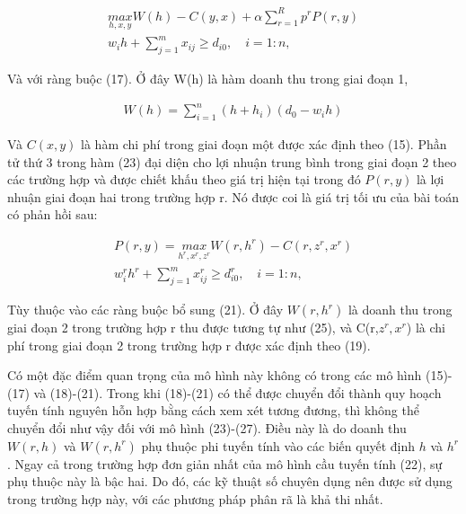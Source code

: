\documentclass[a4paper]{article}
\begin{document}
\begin{itemize}
        \begin{gather}
            \underset{h,x,y}{max}W(h) - C(y,x) + \alpha \sum_{r=1}^{R}p^rP(r,y)\\
            w_ih + \sum_{j=1}^{m}x_{ij} \geq d_{i0}, \quad i=1:n,
        \end{gather}

        Và với ràng buộc (17). Ở đây W(h) là hàm doanh thu trong giai đoạn 1,

        \begin{gather}
            W(h) = \sum_{i=1}^{n}(h+h_i)(d_0-w_ih)
        \end{gather}

        Và $C(x,y)$ là hàm chi phí trong giai đoạn một được xác định theo (15).
        Phần tử thứ 3 trong hàm (23) đại diện cho lợi nhuận trung bình trong giai đoạn 2 theo các trường hợp và được chiết khấu theo giá trị hiện tại trong đó 
        $P(r,y)$ là lợi nhuận giai đoạn hai trong trường hợp r.
        Nó được coi là giá trị tối ưu của bài toán có phản hồi sau:

        \begin{gather}
            P(r,y) = \underset{h^r,x^r,z^r}{max}W(r,h^r) - C(r, z^r,x^r)\\
            w_i^rh^r + \sum_{j=1}^{m}x_{ij}^r \geq d^r_{i0}, \quad i=1:n,
        \end{gather}

        Tùy thuộc vào các ràng buộc bổ sung (21). Ở đây $W(r,h^r)$ là doanh thu trong giai đoạn 2 trong trường hợp r thu được tương tự như (25),
        và C(r,$z^r,x^r$) là chi phí trong giai đoạn 2 trong trường hợp r được xác định theo (19).

        Có một đặc điểm quan trọng của mô hình này không có trong các mô hình (15)-(17)
        và (18)-(21). Trong khi (18)-(21) có thể được chuyển đổi thành quy hoạch tuyến tính nguyên hỗn hợp bằng cách xem xét tương đương, 
        thì không thể chuyển đổi như vậy đối với mô hình (23)-(27). 
        Điều này là do doanh thu $W(r,h)$ và $W(r,h^r)$ phụ thuộc phi tuyến tính vào các biến quyết định $h$ và $h^r$.
        Ngay cả trong trường hợp đơn giản nhất của mô hình cầu tuyến tính (22), sự phụ thuộc này là bậc hai. 
        Do đó, các kỹ thuật số chuyên dụng nên được sử dụng trong trường hợp này, với các phương pháp phân rã là khả thi nhất.
        \\
        

\end{itemize}
\end{document}
